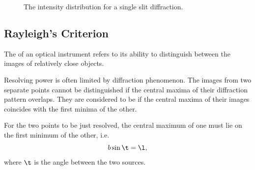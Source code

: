 \begin{figure}[H]
    \centering
    \caption{The intensity distribution for a single slit diffraction.}
\end{figure}

\subsection{Rayleigh's Criterion}

The  of an optical instrument refers to its ability to distinguish between the images of relatively close objects.

Resolving power is often limited by diffraction phenomenon. The images from two separate points cannot be distinguished if the central maxima of their diffraction pattern overlaps. They are considered to be  if the central maxima of their images coincides with the first minima of the other.

\begin{proposition}
    For the two points to be just resolved, the central maximum of one must lie on the first minimum of the other, i.e. \[b \sin \t = \l,\] where $\t$ is the angle between the two sources.
\end{proposition}

